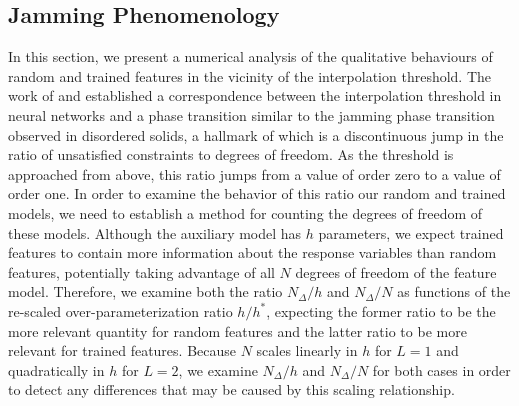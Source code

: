 \documentclass[11pt]{article}
\begin{document}
\subsection{Jamming Phenomenology}
In this section, we present a numerical analysis of the qualitative behaviours of random and trained features in the vicinity of the interpolation threshold. The work of \cite{geigerJammingTransitionParadigm2019} and \cite{spiglerJammingTransitionOverparametrization2019} established a correspondence between the interpolation threshold in neural networks and a phase transition similar to the jamming phase transition observed in disordered solids, a hallmark of which is a discontinuous jump in the ratio of unsatisfied constraints to degrees of freedom. As the threshold is approached from above, this ratio jumps from a value of order zero to a value of order one. In order to examine the behavior of this ratio our random and trained models, we need to establish a method for counting the degrees of freedom of these models. Although the auxiliary model has $h$ parameters, we expect trained features to contain more information about the response variables than random features, potentially taking advantage of all $N$ degrees of freedom of the feature model. Therefore, we examine both the ratio $N_\Delta/h$ and $N_\Delta/N$ as functions of the re-scaled over-parameterization ratio $h/h^*$, expecting the former ratio to be the more relevant quantity for random features and the latter ratio to be more relevant for trained features. Because $N$ scales linearly in $h$ for $L=1$ and quadratically in $h$ for $L=2$, we examine $N_\Delta/h$ and $N_\Delta/N$ for both cases in order to detect any differences that may be caused by this scaling relationship.\\
\end{document}
